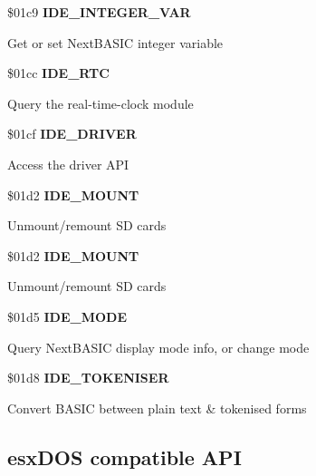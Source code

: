 \$01c9 \textbf{IDE\_INTEGER\_VAR}

Get or set NextBASIC integer variable

\$01cc \textbf{IDE\_RTC}

Query the real-time-clock module

\$01cf \textbf{IDE\_DRIVER}

Access the driver API

\$01d2 \textbf{IDE\_MOUNT}

Unmount/remount SD cards

\$01d2 \textbf{IDE\_MOUNT}

Unmount/remount SD cards

\$01d5 \textbf{IDE\_MODE}

Query NextBASIC display mode info, or change mode

\$01d8 \textbf{IDE\_TOKENISER}

Convert BASIC between plain text \& tokenised forms


\subsection{esxDOS compatible API}
